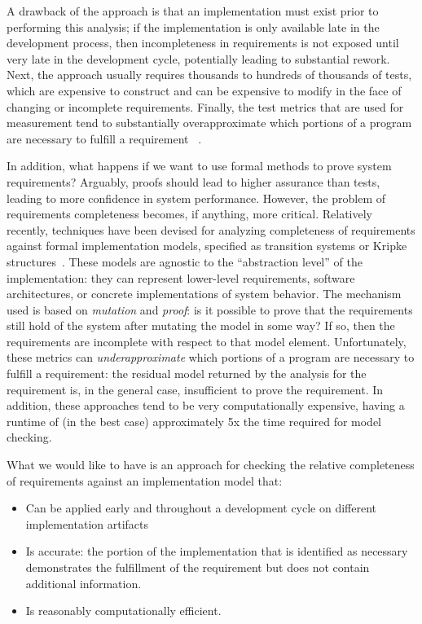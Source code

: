 A drawback of the approach is that an implementation must exist prior to performing this analysis; if the implementation is only available late in the development process, then incompleteness in requirements is not exposed until very late in the development cycle, potentially leading to substantial rework.  Next, the approach usually requires thousands to hundreds of thousands of tests, which are expensive to construct and can be expensive to modify in the face of changing or incomplete requirements.  Finally, the test metrics that are used for measurement tend to substantially overapproximate which portions of a program are necessary to fulfill a requirement~\cite{} .

In addition, what happens if we want to use formal methods to prove system requirements?  Arguably, proofs should lead to higher assurance than tests, leading to more confidence in system performance.  However, the problem of requirements completeness becomes, if anything, more critical.  Relatively recently,
%
%
techniques have been devised for analyzing completeness of requirements against formal implementation models, specified as transition systems or Kripke structures~\cite{}.  These models are agnostic to the ``abstraction level'' of the implementation: they can represent lower-level requirements, software architectures, or concrete implementations of system behavior.  The mechanism used is based on {\em mutation} and {\em proof}: is it possible to prove that the requirements still hold of the system after mutating the model in some way?  If so, then the requirements are incomplete with respect to that model element.  Unfortunately, these metrics can {\em underapproximate} which portions of a program are necessary to fulfill a requirement: the residual model returned by the analysis for the requirement is, in the general case, insufficient to prove the requirement.  In addition, these approaches tend to be very computationally expensive, having a runtime of (in the best case) approximately 5x the time required for model checking.

What we would like to have is an approach for checking the relative completeness of requirements against an implementation model that:
\begin{itemize}
    \item Can be applied early and throughout a development cycle on different implementation artifacts
    \item Is accurate: the portion of the implementation that is identified as necessary demonstrates the
        fulfillment of the requirement but does not contain additional information.
    \item Is reasonably computationally efficient.
\end{itemize}

